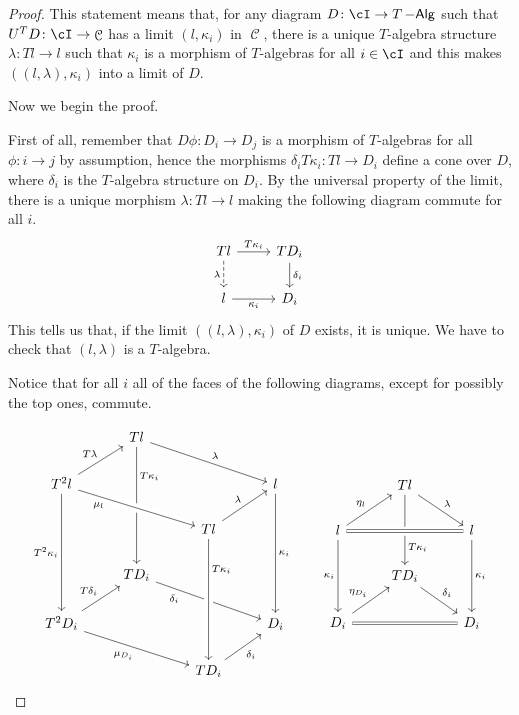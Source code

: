 \documentclass[a4paper,11pt,oneside,openany]{scrbook}
\DeclareMathOperator{\Alg}{-\mathsf{Alg}}
\DeclareMathOperator{\C}{\mathcal{C}}
\theoremstyle{definition}
\theoremstyle{definition}
\begin{document}
\begin{proof}
	This statement means that, for any diagram $D\colon\cI\rightarrow T\Alg$ such that $U^TD\colon\cI\rightarrow\C$ has a limit $(l,\kappa_i)$ in $\C$, there is a unique $T$-algebra structure $\lambda\colon Tl\rightarrow l$ such that $\kappa_i$ is a morphism of $T$-algebras for all $i\in\cI$ and this makes $((l,\lambda),\kappa_i)$ into a limit of $D$.
	
	Now we begin the proof.
	
	First of all, remember that $D\phi\colon D_i\rightarrow D_j$ is a morphism of $T$-algebras for all $\phi\colon i\rightarrow j$ by assumption, hence the morphisms $\delta_i T\kappa_i\colon Tl\rightarrow D_i$ define a cone over $D$, where $\delta_i$ is the $T$-algebra structure on $D_i$. By the universal property of the limit, there is a unique morphism $\lambda\colon Tl\rightarrow l$ making the following diagram commute for all $i$.
	\[
	\begin{tikzcd}
	Tl\ar[d, dashed, "\lambda"'] \ar[r, "T\kappa_i"]
	& TD_i\ar[d, "\delta_i"]\\
	 l\ar[r, "\kappa_i"']
	& D_i
	\end{tikzcd}
	\]	
	This tells us that, if the limit $((l,\lambda),\kappa_i)$ of $D$ exists, it is unique. We have to check that $(l,\lambda)$ is a $T$-algebra.
	
	Notice that for all $i$ all of the faces of the following diagrams, except for possibly the top ones, commute.
	
	\[
		\begin{tikzcd}
			& Tl\ar[drr, "\lambda"]\ar[ddd, "T\kappa_i" near start] \\
			T^2l\ar[ur, "T\lambda"]\ar[drr, crossing over, "\mu_l" near start, swap]\ar[ddd, "T^2\kappa_i"']
			&&& l\ar[ddd, "\kappa_i"] \\
			&& Tl\ar[ur, "\lambda"]%
			\\
			& TD_i\ar[drr, swap, "\delta_i" near start] \\
			T^2D_i\ar[ur, "T\delta_i"]\ar[drr, "\mu_{D_i}"']
			&&& D_i \\
			&& TD_i\ar[ur, "\delta_i"'] \ar[from=uuu,crossing over,  "T\kappa_i" near start]
		\end{tikzcd}
		\quad\quad
		\begin{tikzcd}
			& Tl\ar[dr, "\lambda"]\ar[dd, "T\kappa_i" near end] \\
			l\ar[ur, "\eta_l"]\ar[rr, crossing over, equal]\ar[dd, swap, "\kappa_i"]
			&& l\ar[dd, "\kappa_i"] \\
			& TD_i\ar[dr, "\delta_i"] \\
			D_i\ar[ur, "\eta_{D_i}"]\ar[rr, equal]
			&& D_i
		\end{tikzcd}
	\]
	

\end{proof}
\end{document}
